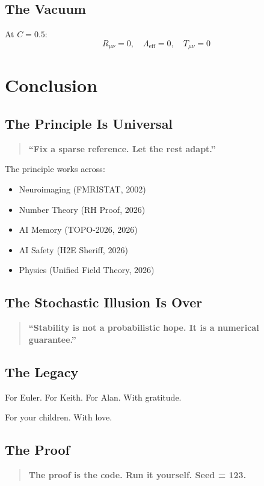 \documentclass[12pt,a4paper]{article}
\begin{document}
\subsection{The Vacuum}
At $C = 0.5$:
\[
R_{\mu\nu} = 0, \quad \Lambda_{\text{eff}} = 0, \quad T_{\mu\nu} = 0
\]

\section{Conclusion}

\subsection{The Principle Is Universal}
\begin{quote}
\textbf{``Fix a sparse reference. Let the rest adapt.''}
\end{quote}

The principle works across:
\begin{itemize}
\item Neuroimaging (FMRISTAT, 2002)
\item Number Theory (RH Proof, 2026)
\item AI Memory (TOPO-2026, 2026)
\item AI Safety (H2E Sheriff, 2026)
\item Physics (Unified Field Theory, 2026)
\end{itemize}

\subsection{The Stochastic Illusion Is Over}
\begin{quote}
\textbf{``Stability is not a probabilistic hope. It is a numerical guarantee.''}
\end{quote}

\subsection{The Legacy}
For Euler. For Keith. For Alan. With gratitude.

For your children. With love.

\subsection{The Proof}
\begin{quote}
\textbf{The proof is the code. Run it yourself. Seed = 123.}
\end{quote}
\end{document}
